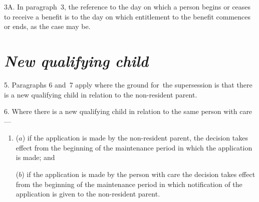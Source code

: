\documentclass[12pt,a4paper]{article}
\begin{document}
\medskip

3A.  In paragraph~3, the reference to the day on which a person begins or ceases to receive a benefit is to the day on which entitlement to the benefit commences or ends, as the case may be.


%

\section*{\itshape New qualifying child}

5.  Paragraphs 6 and~7 apply where the ground for~the supersession is that there is a new qualifying child in relation to the non-resident parent.

\medskip

6.  Where there is a new qualifying child in relation to the same person with care—
\begin{enumerate}\item[]
($a$) if the application is made by the non-resident parent, the decision takes effect from the beginning of the maintenance period in which the application is made; and

($b$) if the application is made by the person with care the decision takes effect from the beginning of the maintenance period in which notification of the application is given to the non-resident parent.
\end{enumerate}
\end{document}
